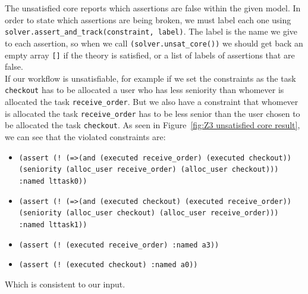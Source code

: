 \documentclass[a4paper]{report}
\begin{document}
The unsatisfied core reports which assertions are false within the given model. In order to state which assertions are being broken, we must label each one using \texttt{solver.assert\_and\_track(constraint, label)}. The label is the name we give to each assertion, so when we call \texttt{(solver.unsat\_core())} we should get back an empty array \texttt{[]} if the theory is satisfied, or a list of labels of assertions that are false. \\

If our workflow is unsatisfiable, for example if we set the constraints as the task \texttt{checkout} has to be allocated a user who has less seniority than whomever is allocated the task \texttt{receive\_order}. But we also have a constraint that whomever is allocated the task \texttt{receive\_order} has to be less senior than the user chosen to be allocated the task \texttt{checkout}. As seen in Figure~\ref{fig:Z3 unsatisfied core result}, we can see that the violated constraints are:
\begin{itemize}
\item  \texttt{(assert (! (=>(and (executed receive\_order) (executed checkout))\\
(seniority (alloc\_user receive\_order) (alloc\_user checkout)))\\
:named lttask0))}
\item \texttt{(assert (! (=>(and (executed checkout) (executed receive\_order))\\
(seniority (alloc\_user checkout) (alloc\_user receive\_order))) \\
:named lttask1))}
\item \texttt{(assert (! (executed receive\_order) :named a3))}
\item \texttt{(assert (! (executed checkout) :named a0))}
\end{itemize}
Which is consistent to our input.
\end{document}
